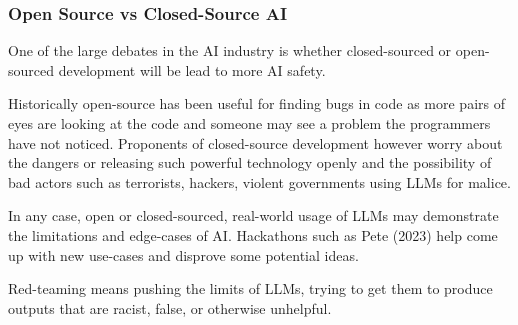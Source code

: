 \documentclass[
  letterpaper,
  DIV=11,
  numbers=noendperiod]{scrartcl}
\begin{document}
\subsubsection{Open Source vs Closed-Source
AI}\label{open-source-vs-closed-source-ai}

One of the large debates in the AI industry is whether closed-sourced or
open-sourced development will be lead to more AI safety.

Historically open-source has been useful for finding bugs in code as
more pairs of eyes are looking at the code and someone may see a problem
the programmers have not noticed. Proponents of closed-source
development however worry about the dangers or releasing such powerful
technology openly and the possibility of bad actors such as terrorists,
hackers, violent governments using LLMs for malice.

In any case, open or closed-sourced, real-world usage of LLMs may
demonstrate the limitations and edge-cases of AI. Hackathons such as
Pete (2023) help come up with new use-cases and disprove some potential
ideas.

Red-teaming means pushing the limits of LLMs, trying to get them to
produce outputs that are racist, false, or otherwise unhelpful.
\end{document}
